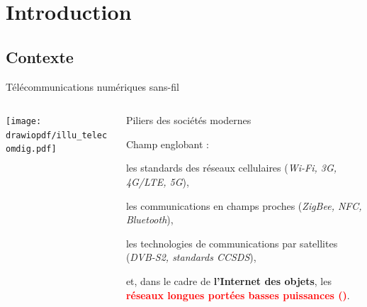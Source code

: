 \documentclass[../main.tex]{subfiles}
\begin{document}
\section{Introduction}

\subsection{Contexte}

\begin{frame}{Télécommunications numériques sans-fil}
  \begin{columns}
    \begin{column}{.4\linewidth}
      \begin{center}
        \texttt{[image: drawiopdf/illu\_telecomdig.pdf]}
      \end{center}
    \end{column}
    \begin{column}{.55\linewidth} \large
      \begin{overlayarea}{\linewidth}{.75\textheight}
        \begin{ctrlitemize}{1em}
          \item Piliers des sociétés modernes
          \item Champ englobant :
          \begin{ctrlitemize}{1em}
            \item les standards des réseaux cellulaires (\textit{Wi-Fi, 3G, 4G/LTE, 5G}),
            \item les communications en champs proches (\textit{ZigBee, NFC, Bluetooth}),
            \item les technologies de communications par satellites (\textit{DVB-S2, standards CCSDS}),
            \item et, dans le cadre de \textbf{l'Internet des objets}, les \textbf{\textcolor{red}{réseaux longues portées basses puissances ()}}.
          \end{ctrlitemize}
        \end{ctrlitemize}
      \end{overlayarea}
    \end{column}
  \end{columns}
\end{frame}
\end{document}
